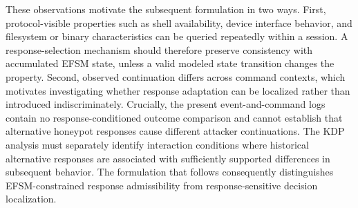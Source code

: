 These observations motivate the subsequent formulation in two ways.
First, protocol-visible properties such as shell availability, device
interface behavior, and filesystem or binary characteristics can be
queried repeatedly within a session. A response-selection mechanism
should therefore preserve consistency with accumulated EFSM state,
unless a valid modeled state transition changes the property. Second,
observed continuation differs across command contexts, which motivates
investigating whether response adaptation can be localized rather than
introduced indiscriminately. Crucially, the present event-and-command
logs contain no response-conditioned outcome comparison and cannot
establish that alternative honeypot responses cause different attacker
continuations. The KDP analysis must separately identify interaction
conditions where historical alternative responses are associated with
sufficiently supported differences in subsequent behavior. The
formulation that follows consequently distinguishes EFSM-constrained
response admissibility from response-sensitive decision localization.
